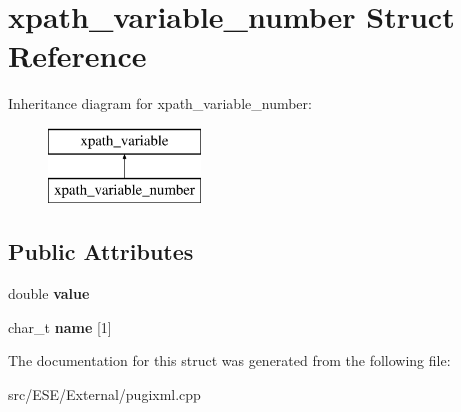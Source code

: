 \hypertarget{structxpath__variable__number}{\section{xpath\-\_\-variable\-\_\-number Struct Reference}
\label{structxpath__variable__number}
}
Inheritance diagram for xpath\-\_\-variable\-\_\-number\-:\begin{figure}[H]
\begin{center}
\leavevmode
\includegraphics[height=2.000000cm]{structxpath__variable__number}
\end{center}
\end{figure}
\subsection*{Public Attributes}
\begin{DoxyCompactItemize}
\item 
\hypertarget{structxpath__variable__number_a49949397348e7c941d88a694ec5c8e57}{double {\bfseries value}}\label{structxpath__variable__number_a49949397348e7c941d88a694ec5c8e57}

\item 
\hypertarget{structxpath__variable__number_a2bf4163dab1a8e233d45677fee987f0f}{char\-\_\-t {\bfseries name} \mbox{[}1\mbox{]}}\label{structxpath__variable__number_a2bf4163dab1a8e233d45677fee987f0f}

\end{DoxyCompactItemize}


The documentation for this struct was generated from the following file\-:\begin{DoxyCompactItemize}
\item 
src/\-E\-S\-E/\-External/pugixml.\-cpp\end{DoxyCompactItemize}
